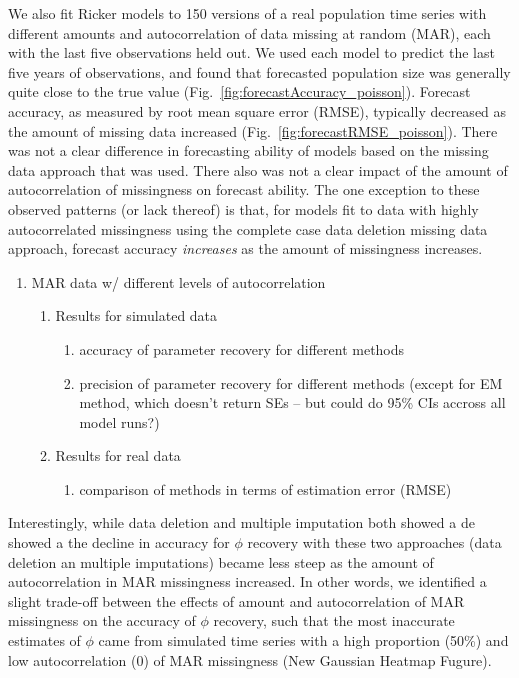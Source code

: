 We also fit Ricker models to 150 versions of a real population time series with different amounts and autocorrelation of data missing at random (MAR), each with the last five observations held out. We used each model to predict the last five years of observations, and found that forecasted population size  was generally quite close to the true value (Fig.\ \ref{fig:forecastAccuracy_poisson}). Forecast accuracy, as measured by root mean square error (RMSE), typically decreased as the amount of missing data increased (Fig.\ \ref{fig:forecastRMSE_poisson}). There was not a clear difference in forecasting ability of models based on the missing data approach that was used. There also was not a clear impact of the amount of autocorrelation of missingness on forecast ability. The one exception to these observed patterns (or lack thereof) is that, for models fit to data with highly autocorrelated missingness using the complete case data deletion missing data approach, forecast accuracy \textit{increases} as the amount of missingness increases. 


\begin{enumerate}
   \item MAR data w/ different levels of autocorrelation
        \begin{enumerate}
            \item Results for simulated data
            \begin{enumerate}
                \item accuracy of parameter recovery for different methods
                \item precision of parameter recovery for different methods (except for EM method, which doesn't return SEs -- but could do 95\% CIs accross all model runs?)
            \end{enumerate}
            \item Results for real data 
            \begin{enumerate}
                 \item comparison of methods in terms of estimation error (RMSE)
            \end{enumerate}
        \end{enumerate}
\end{enumerate}

Interestingly, while data deletion and multiple imputation both showed a de showed a the decline in accuracy for $\phi$ recovery with these two approaches (data deletion an multiple imputations) became less steep as the amount of autocorrelation in MAR missingness increased. 
In other words, we identified a slight trade-off between the effects of amount and autocorrelation of MAR missingness on the accuracy of $\phi$ recovery, such that the most inaccurate estimates of $\phi$ came from simulated time series with a high proportion (50\%) and low autocorrelation (0) of MAR missingness ({New Gaussian Heatmap Fugure}).
